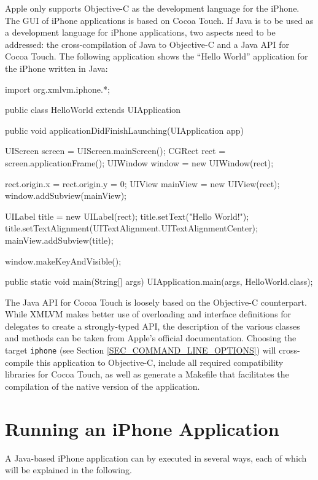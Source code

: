 \documentclass[11pt]{book}
\begin{document}
Apple only supports Objective-C as the development language for the
iPhone. The GUI of iPhone applications is based on Cocoa Touch. If
Java is to be used as a development language for iPhone applications,
two aspects need to be addressed: the cross-compilation of Java to
Objective-C and a Java API for Cocoa Touch. The following application
shows the ``Hello World'' application for the iPhone written in Java:

\begin{code}
import org.xmlvm.iphone.*;

public class HelloWorld extends UIApplication {

    public void applicationDidFinishLaunching(UIApplication app) {
        UIScreen screen = UIScreen.mainScreen();
        CGRect rect = screen.applicationFrame();
        UIWindow window = new UIWindow(rect);

        rect.origin.x = rect.origin.y = 0;
        UIView mainView = new UIView(rect);
        window.addSubview(mainView);

        UILabel title = new UILabel(rect);
        title.setText("Hello World!");
        title.setTextAlignment(UITextAlignment.UITextAlignmentCenter);
        mainView.addSubview(title);

        window.makeKeyAndVisible();
    }

    public static void main(String[] args) {
        UIApplication.main(args, HelloWorld.class);
    }

}
\end{code}


The Java API for Cocoa Touch is loosely based on the Objective-C
counterpart. While XMLVM makes better use of overloading and interface
definitions for delegates to create a strongly-typed API, the
description of the various classes and methods can be taken from
Apple's official documentation. Choosing the target \texttt{iphone}
(see Section \ref{SEC_COMMAND_LINE_OPTIONS}) will cross-compile this
application to Objective-C, include all required compatibility
libraries for Cocoa Touch, as well as generate a Makefile that
facilitates the compilation of the native version of the application.


\section{Running an iPhone Application}
\label{SEC_RUNNING_IPHONE_APP}

A Java-based iPhone application can by executed in several ways, each
of which will be explained in the following.
\end{document}
